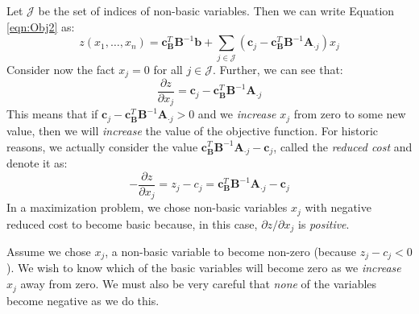 Let $\mathcal{J}$ be the set of indices of non-basic variables. Then we can write Equation \ref{eqn:Obj2} as:
\begin{equation}
z(x_1,\dots,x_n) = \mathbf{c}_\mathbf{B}^T\mathbf{B}^{-1}\mathbf{b} + 
\sum_{j \in \mathcal{J}}\left(\mathbf{c}_j - \mathbf{c}_\mathbf{B}^T\mathbf{B}^{-1}\mathbf{A}_{\cdot j}\right)x_j
\end{equation}
Consider now the fact $x_j = 0$ for all $j \in \mathcal{J}$. Further, we can see that:
\begin{equation}
\frac{\partial z}{\partial x_j} = \mathbf{c}_j - \mathbf{c}_\mathbf{B}^T\mathbf{B}^{-1}\mathbf{A}_{\cdot j}
\end{equation}
This means that if $\mathbf{c}_j - \mathbf{c}_\mathbf{B}^T\mathbf{B}^{-1}\mathbf{A}_{\cdot j} > 0$ and we \textit{increase} $x_j$ from zero to some new value, then we will \textit{increase} the value of the objective function. For historic reasons, we actually consider the value 
$\mathbf{c}_\mathbf{B}^T\mathbf{B}^{-1}\mathbf{A}_{\cdot j} - \mathbf{c}_j$, called the \textit{reduced cost} and denote it as:
\begin{equation}
-\frac{\partial z}{\partial x_j} = z_j - c_j = \mathbf{c}_\mathbf{B}^T\mathbf{B}^{-1}\mathbf{A}_{\cdot j} - \mathbf{c}_j
\end{equation}
In a maximization problem, we chose non-basic variables $x_j$ with negative reduced cost to become basic because, in this case, $\partial z/\partial x_j$ is \textit{positive}. 

Assume we chose $x_j$, a non-basic variable to become non-zero (because $z_j - c_j < 0$). We wish to know which of the basic variables will become zero as we \textit{increase} $x_j$ away from zero. We must also be very careful that \textit{none} of the variables become negative as we do this. 

